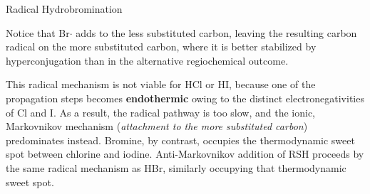 \documentclass[10pt]{article}
\begin{document}
\begin{core}[label=core:alkene_radical_hbr]{Radical Hydrobromination}
\begin{enumerate}

          Notice that Br$\cdot$ adds to the less substituted carbon, leaving the resulting carbon radical on the more substituted carbon, where it is better stabilized by hyperconjugation than in the alternative regiochemical outcome.

        \end{enumerate}

        This radical mechanism is not viable for HCl or HI, because one of the propagation steps becomes \textbf{endothermic} owing to the distinct electronegativities of Cl and I. As a result, the radical pathway is too slow, and the ionic, Markovnikov mechanism (\textit{attachment to the more substituted carbon}) predominates instead. Bromine, by contrast, occupies the thermodynamic sweet spot between chlorine and iodine. Anti-Markovnikov addition of RSH proceeds by the same radical mechanism as HBr, similarly occupying that thermodynamic sweet spot.

      \end{core}
\end{document}
